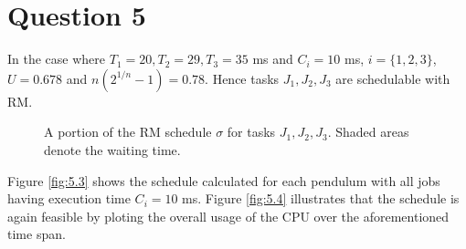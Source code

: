 \section{Question 5}

In the case where $T_1 = 20, T_2 = 29, T_3 = 35$ ms and $C_i = 10$ ms,
$i=\{1,2,3\}$, $U=0.678$ and $n(2^{1/n} - 1) = 0.78$. Hence tasks $J_1, J_2, J_3$
are schedulable with RM.

\begin{figure}[H]\centering
  \scalebox{0.7}{}
  \caption{A portion of the RM schedule $\sigma$ for tasks $J_1, J_2, J_3$.
    Shaded areas denote the waiting time.}
\end{figure}
Figure \ref{fig:5.3} shows the schedule calculated for each pendulum with all
jobs having execution time $C_i = 10$ ms.  Figure \ref{fig:5.4} illustrates that
the schedule is again feasible by ploting the overall usage of the CPU over the
aforementioned time span.


\noindent{}
